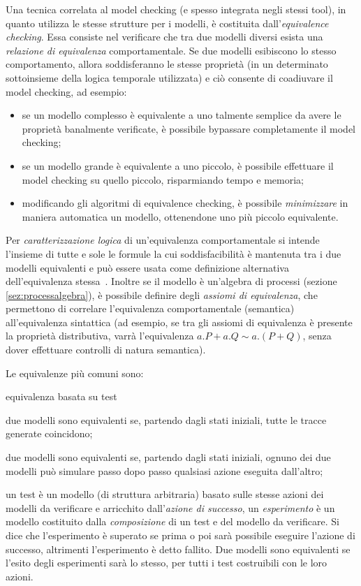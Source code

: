 		Una tecnica correlata al model checking (e spesso integrata negli stessi tool), in quanto utilizza le stesse strutture per i modelli, \`e costituita dall'\emph{e\-quiv\-a\-lence checking}. Essa consiste nel verificare che tra due modelli diversi esista una \emph{relazione di equivalenza} comportamentale.
		Se due modelli esibiscono lo stesso comportamento, allora soddisferanno le stesse propriet\`a (in un determinato sottoinsieme della logica temporale utilizzata) e ci\`o consente di coadiuvare il model checking, ad esempio:
		\begin{itemize}
			\item se un modello complesso \`e equivalente a uno talmente semplice da avere le propriet\`a banalmente verificate, \`e possibile bypassare completamente il model checking;
			\item se un modello grande \`e equivalente a uno piccolo, \`e possibile effettuare il model checking su quello piccolo, risparmiando tempo e memoria;
			\item modificando gli algoritmi di equivalence checking, \`e possibile \emph{minimizzare} in maniera automatica un modello, ottenendone uno pi\`u piccolo equivalente.
		\end{itemize}
		
		Per \emph{caratterizzazione logica} di un'equivalenza comportamentale si intende l'insieme di tutte e sole le formule la cui soddisfacibilit\`a \`e mantenuta tra i due modelli equivalenti e pu\`o essere usata come definizione alternativa dell'equivalenza stessa~\cite{bernardo2008survey}.
		 Inoltre se il modello \`e un'algebra di processi (sezione \ref{sez:processalgebra}), \`e possibile definire degli \emph{assiomi di equivalenza}, che permettono di correlare l'equivalenza comportamentale (semantica) all'equivalenza sintattica (ad esempio, se tra gli assiomi di equivalenza \`e presente la propriet\`a distributiva, varr\`a l'equivalenza $a.P + a.Q \sim a.(P + Q)$, senza dover effettuare controlli di natura semantica).
		
		Le equivalenze pi\`u comuni sono:
		\begin{labeling}{equivalenza basata su test}
			\item [equivalenza a tracce] due modelli sono equivalenti se, partendo dagli stati iniziali, tutte le tracce generate coincidono;
			\item [bisimulazione] due modelli sono equivalenti se, partendo dagli stati iniziali, ognuno dei due modelli pu\`o simulare passo dopo passo qualsiasi azione eseguita dall'altro;
			\item [equivalenza basata su test] un test \`e un modello (di struttura arbitraria) basato sulle stesse azioni dei modelli da verificare e arricchito dall'\emph{azione di successo}, un \emph{esperimento} \`e un modello costituito dalla \emph{composizione} di un test e del modello da verificare.
			Si dice che l'esperimento \`e superato se prima o poi sar\`a possibile eseguire l'azione di successo, altrimenti l'esperimento \`e detto fallito. Due modelli sono equivalenti se l'esito degli esperimenti sar\`a lo stesso, per tutti i test costruibili con le loro azioni.
		\end{labeling}
		
